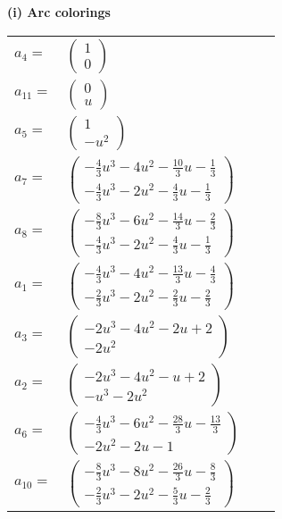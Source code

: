 \documentclass[1p]{elsarticle_modified}
\theoremstyle{definition}
\begin{document}
\flushleft \textbf{(i) Arc colorings}\\
\begin{tabular}{m{7pt} m{180pt} m{7pt} m{180pt} }
\flushright $a_{4}=$&$\begin{pmatrix}1\\0\end{pmatrix}$ \\
\flushright $a_{11}=$&$\begin{pmatrix}0\\u\end{pmatrix}$ \\
\flushright $a_{5}=$&$\begin{pmatrix}1\\- u^2\end{pmatrix}$ \\
\flushright $a_{7}=$&$\begin{pmatrix}-\frac{4}{3} u^3-4 u^2-\frac{10}{3} u-\frac{1}{3}\\-\frac{4}{3} u^3-2 u^2-\frac{4}{3} u-\frac{1}{3}\end{pmatrix}$ \\
\flushright $a_{8}=$&$\begin{pmatrix}-\frac{8}{3} u^3-6 u^2-\frac{14}{3} u-\frac{2}{3}\\-\frac{4}{3} u^3-2 u^2-\frac{4}{3} u-\frac{1}{3}\end{pmatrix}$ \\
\flushright $a_{1}=$&$\begin{pmatrix}-\frac{4}{3} u^3-4 u^2-\frac{13}{3} u-\frac{4}{3}\\-\frac{2}{3} u^3-2 u^2-\frac{2}{3} u-\frac{2}{3}\end{pmatrix}$ \\
\flushright $a_{3}=$&$\begin{pmatrix}-2 u^3-4 u^2-2 u+2\\-2 u^2\end{pmatrix}$ \\
\flushright $a_{2}=$&$\begin{pmatrix}-2 u^3-4 u^2- u+2\\- u^3-2 u^2\end{pmatrix}$ \\
\flushright $a_{6}=$&$\begin{pmatrix}-\frac{4}{3} u^3-6 u^2-\frac{28}{3} u-\frac{13}{3}\\-2 u^2-2 u-1\end{pmatrix}$ \\
\flushright $a_{10}=$&$\begin{pmatrix}-\frac{8}{3} u^3-8 u^2-\frac{26}{3} u-\frac{8}{3}\\-\frac{2}{3} u^3-2 u^2-\frac{5}{3} u-\frac{2}{3}\end{pmatrix}$ \\

\end{tabular}
\end{document}
